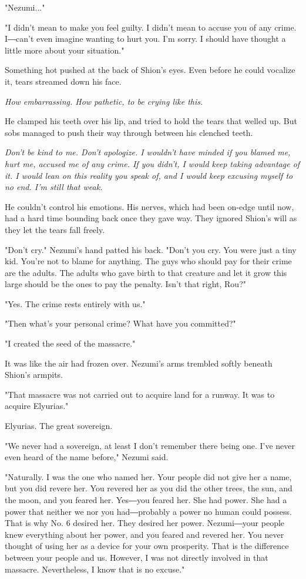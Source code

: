 "Nezumi..."

"I didn't mean to make you feel guilty. I didn't mean to accuse you of
any crime. I―can't even imagine wanting to hurt you. I'm sorry. I should
have thought a little more about your situation."

Something hot pushed at the back of Shion's eyes. Even before he could
vocalize it, tears streamed down his face.

\emph{How embarrassing. How pathetic, to be crying like this.}

He clamped his teeth over his lip, and tried to hold the tears that
welled up. But sobs managed to push their way through between his
clenched teeth.

\emph{Don't be kind to me. Don't apologize. I wouldn't have minded if you
	blamed me, hurt me, accused me of any crime. If you didn't, I would keep
	taking advantage of it. I would lean on this reality you speak of, and I
	would keep excusing myself to no end. I'm still that weak.}

He couldn't control his emotions. His nerves, which had been on-edge
until now, had a hard time bounding back once they gave way. They
ignored Shion's will as they let the tears fall freely.

"Don't cry." Nezumi's hand patted his back. "Don't you cry. You were
just a tiny kid. You're not to blame for anything. The guys who should
pay for their crime are the adults. The adults who gave birth to that
creature and let it grow this large should be the ones to pay the
penalty. Isn't that right, Rou?"

"Yes. The crime rests entirely with us."

"Then what's your personal crime? What have you committed?"

"I created the seed of the massacre."

It was like the air had frozen over. Nezumi's arms trembled softly
beneath Shion's armpits.

"That massacre was not carried out to acquire land for a runway. It was
to acquire Elyurias."

Elyurias. The great sovereign.

\mybreak

"We never had a sovereign, at least I don't remember there being one.
I've never even heard of the name before," Nezumi said.

"Naturally. I was the one who named her. Your people did not give her a
name, but you did revere her. You revered her as you did the other
trees, the sun, and the moon, and you feared her. Yes―you feared her.
She had power. She had a power that neither we nor you had―probably a
power no human could possess. That is why No. 6 desired her. They
desired her power. Nezumi―your people knew everything about her power,
and you feared and revered her. You never thought of using her as a
device for your own prosperity. That is the difference between your
people and us. However, I was not directly involved in that massacre.
Nevertheless, I know that is no excuse."

